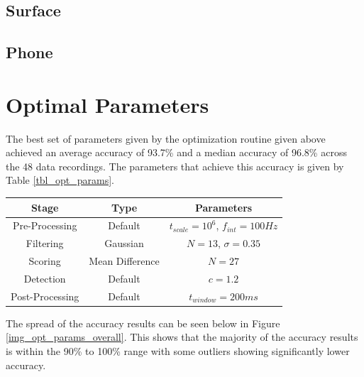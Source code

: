             \subsection{Surface}

            \subsection{Phone}

        \section{Optimal Parameters}

            The best set of parameters given by the optimization routine given above achieved an average accuracy of 93.7\% and a median accuracy of 96.8\% across the 48 data recordings. The parameters that achieve this accuracy is given by Table \ref{tbl_opt_params}.

            \begin{center}
                \label{tbl_opt_params}
                \begin{tabular}{|c|c|c|}
                    \hline
                    Stage & Type & Parameters \\
                    \hline
                    Pre-Processing & Default & $t_{scale}=10^6$, $f_{int}=100Hz$ \\
                    Filtering & Gaussian & $N=13$, $\sigma=0.35$ \\
                    Scoring & Mean Difference & $N=27$ \\
                    Detection & Default & $c=1.2$ \\
                    Post-Processing & Default & $t_{window}=200ms$ \\
                    \hline
                \end{tabular}
            \end{center}

            The spread of the accuracy results can be seen below in Figure \ref{img_opt_params_overall}. This shows that the majority of the accuracy results is within the 90\% to 100\% range with some outliers showing significantly lower accuracy.

